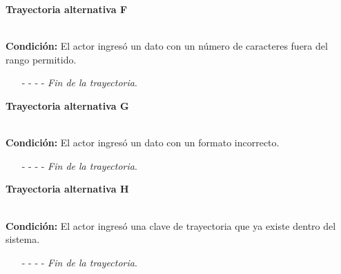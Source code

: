 \hypertarget{CU12-1-1-2:TAF}{\textbf{Trayectoria alternativa F}}\\
\noindent \textbf{Condición:} El actor ingresó un dato con un número de caracteres fuera del rango permitido.
\begin{enumerate}
	\UCpaso[\UCsist] Muestra el mensaje  señalando el campo que presenta el error en la pantalla .
	\UCpaso Regresa al paso \ref{CU12.1.1.2-P15} de la trayectoria principal.
	\item[- -] - - {\em {Fin de la trayectoria}}.%
\end{enumerate}
\hypertarget{CU12-1-1-2:TAG}{\textbf{Trayectoria alternativa G}}\\
\noindent \textbf{Condición:} El actor ingresó un dato con un formato incorrecto.
\begin{enumerate}
	\UCpaso[\UCsist] Muestra el mensaje  señalando el campo que presenta el error en la pantalla .
	\UCpaso Regresa al paso \ref{CU12.1.1.2-P15} de la trayectoria principal.
	\item[- -] - - {\em {Fin de la trayectoria}}.
\end{enumerate}
\hypertarget{CU2-1-1-2:TAH}{\textbf{Trayectoria alternativa H}}\\
\noindent \textbf{Condición:} El actor ingresó una clave de trayectoria que ya existe dentro del sistema.
\begin{enumerate}
	\UCpaso[\UCsist] Muestra el mensaje  señalando el campo que presenta la duplicidad en la pantalla .
	\UCpaso Regresa al paso \ref{CU12.1.1.2-P15} de la trayectoria principal.
	\item[- -] - - {\em {Fin de la trayectoria}}.
\end{enumerate}

